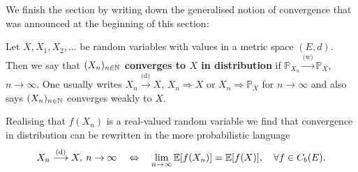 We finish the section by writing down the generalised notion of convergence that was announced at the beginning of this section:
\begin{ldef}
\begin{deff}
	Let $X, X_1, X_2,...$ be random variables with values in a metric space $(E,d)$. Then we say that \textbf{$(X_n)_{n\in\mathbb{N}}$ converges to $X$ in distribution} if $\mathbb{P}_{X_n} \overset{\text{(w)}}{\longrightarrow} \mathbb{P}_{X}$, $n\to \infty$. One usually writes $X_n\overset{\text{(d)}}{\to} X$, $X_n \Rightarrow X$ or $X_n \Rightarrow \mathbb{P}_X$ for $n\to\infty$ and also says $(X_n)_{n\in\mathbb{N}}$ converges weakly to $X$. 
\end{deff}
\end{ldef}
Realising that $f(X_n)$ is a real-valued random variable we find that convergence in distribution can be rewritten in the more probabilistic language 
\begin{align*}
	X_n \overset{\text{(d)}}{\longrightarrow}X,\: n\to\infty\quad  \Leftrightarrow\quad \lim_{n\to\infty} \mathbb{E}[f(X_n)]= \mathbb{E}[f(X)],\quad \forall f\in C_b(E).
\end{align*}


